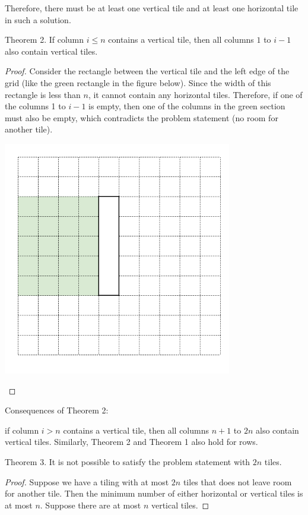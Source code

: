 \begin{solution}
Therefore, there must be at least one vertical tile and at least one horizontal tile in such a solution.

\begin{theorem} Theorem 2. If column $i  \leq n$ contains a vertical tile, then all columns $1$ to $i-1$ also contain vertical tiles.
\end{theorem}
\begin{proof}
	Consider the rectangle between the vertical tile and the left edge of the grid (like the green rectangle in the figure below). Since the width of this rectangle is less than $n$, it cannot contain any horizontal tiles. Therefore, if one of the columns 1 to $i-1$ is empty, then one of the columns in the green section must also be empty, which contradicts the problem statement (no room for another tile).
	
\begin{center}
	\includegraphics[width=10cm]{65/figs/65_sol1.png}
\end{center}
	
\end{proof}

Consequences of Theorem 2:

if column $i > n$ contains a vertical tile, then all columns $n+1$ to $2n$ also contain vertical tiles.
Similarly, Theorem 2 and Theorem 1 also hold for rows.

\begin{theorem} Theorem 3. It is not possible to satisfy the problem statement with $2n$ tiles.
\end{theorem}
\begin{proof}
Suppose we have a tiling with at most $2n$ tiles that does not leave room for another tile. Then the minimum number of either horizontal or vertical tiles is at most $n$. Suppose there are at most $n$ vertical tiles.


\end{proof}
\end{solution}

